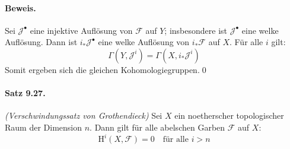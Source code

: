 \paragraph{Beweis.} Sei $\mathcal{J}^\bullet$ eine injektive Auflösung von $\mathcal{F}$ auf $Y$; insbesondere ist $\mathcal{J}^\bullet$ eine welke Auflösung. Dann ist $i_\ast\mathcal{J}^\bullet$ eine welke Auflösung von $i_\ast\mathcal{F}$ auf $X$. Für alle $i$ gilt:
\[\Gamma(Y,\mathcal{J}^i) = \Gamma(X,i_\ast\mathcal{J}^i) \]
Somit ergeben sich die gleichen Kohomologiegruppen.\qed

\paragraph{Satz 9.27.}\label{9.27} \textit{(Verschwindungssatz von Grothendieck)} Sei $X$ ein noetherscher topologischer Raum der Dimension $n$. Dann gilt für alle abelschen Garben $\mathcal{F}$ auf $X$:
\[\mathrm{H}^i(X,\mathcal{F})=0\quad\text{für alle }i>n \]

